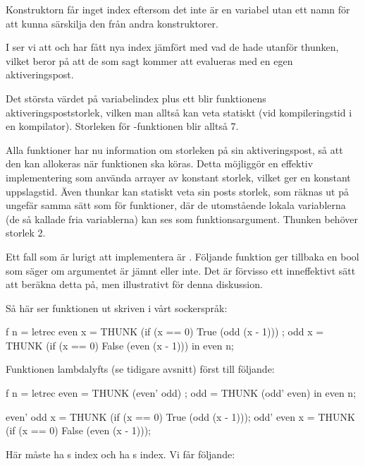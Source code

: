 \documentclass[../Core]{subfiles}
\begin{document}
Konstruktorn  får inget index eftersom det inte är en variabel
utan ett namn för att kunna särskilja den från andra konstruktorer. 

I  ser vi att 
 och  har fått nya index jämfört med vad de
hade utanför thunken, vilket beror på att de som sagt kommer att evalueras
med en egen aktiveringspost.

Det största värdet på variabelindex plus ett blir funktionens
aktiveringspoststorlek, vilken man alltså kan veta statiskt
(vid kompileringstid i en kompilator). Storleken för -funktionen blir alltså 7.

Alla funktioner har nu information om storleken på sin aktiveringspost, så att 
den kan allokeras när funktionen ska köras.
Detta möjliggör en effektiv implementering som använda arrayer av konstant 
storlek, vilket ger en konstant uppslagstid.
Även thunkar kan statiskt veta sin posts storlek,
som räknas ut på ungefär samma sätt som
för funktioner, där de utomstående lokala variablerna (de så kallade fria 
variablerna) kan ses som funktionsargument.
Thunken  behöver storlek 2.

Ett fall som är lurigt att implementera är .
Följande funktion  ger tillbaka en bool som säger om 
argumentet  är jämnt eller inte. Det är förvisso ett
inneffektivt sätt att beräkna detta på, men illustrativt för denna diskussion.

Så här ser funktionen ut skriven i vårt sockerspråk:

\begin{codeEx}
f n = letrec 
    { even x = THUNK (if (x == 0) True  (odd  (x - 1)))
    ; odd  x = THUNK (if (x == 0) False (even (x - 1)))
    } in even n;
\end{codeEx}

Funktionen lambdalyfts (se tidigare avsnitt) först till följande:

\begin{codeEx}
f n = letrec 
    { even = THUNK (even' odd)
    ; odd  = THUNK (odd' even)
    } in even n;
    
even' odd x = THUNK (if (x == 0) True  (odd  (x - 1)));
odd' even x = THUNK (if (x == 0) False (even (x - 1)));
\end{codeEx}

Här måste  ha s index och  ha s index. Vi får följande:
\end{document}
